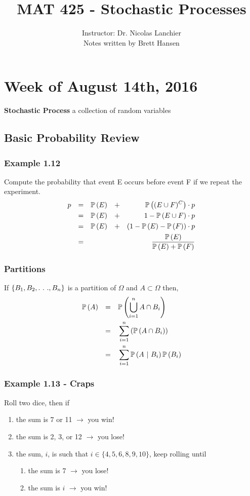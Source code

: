 \documentclass{article}
\title{MAT 425 - Stochastic Processes}
\author{
{\large Instructor: Dr. Nicolas Lanchier} \\
		Notes written by Brett Hansen
}
\date{}
\begin{document}
\maketitle
\tableofcontents
\break

\section{Week of August 14th, 2016}

\textbf{Stochastic Process} \quad a collection of random variables

\subsection{Basic Probability Review}
\subsubsection{Example 1.12}
Compute the probability that event E occurs before event F if we repeat the experiment.
\begin{align*}
p &&= &&\mathbb{P}\left(E\right) &&+ &&\mathbb{P}\left((E \cup F)^C\right) \cdot p \\
  &&= &&\mathbb{P}\left(E\right) &&+ &&1 - \mathbb{P}\left(E \cup F\right) \cdot p \\
  &&= &&\mathbb{P}\left(E\right) &&+ &&(1 - \mathbb{P}\left(E\right) - \mathbb{P}\left(F\right)) \cdot p \\
  &&= &&&&&&\frac{\mathbb{P}\left(E\right)}{\mathbb{P}\left(E\right) + \mathbb{P}\left(F\right)}
\end{align*}

\subsubsection{Partitions}
If $\{B_1, B_2, .\ .\ ., B_n\}$ is a partition of $\Omega$ and $A \subset \Omega$ then,
\begin{align*}
\mathbb{P}\left(A\right) 	&&= &&&\mathbb{P}\left(\bigcup_{i=1}^n A \cap B_i\right) \\
			&&= &&&\sum_{i=1}^n \left(\mathbb{P}\left(A \cap B_i\right)\right) \\
			&&= &&&\sum_{i=1}^n \mathbb{P}\left(A\ |\  B_i\right)\mathbb{P}\left(B_i\right)
\end{align*}

\subsubsection{Example 1.13 - Craps}
Roll two dice, then if
\begin{enumerate}
	\item the sum is 7 or 11 $\longrightarrow$ you win!
	\item the sum is 2, 3, or 12 $\longrightarrow$ you lose!
	\item the sum, $i$, is such that $i \in \{4, 5, 6, 8, 9, 10\}$, keep rolling until
	\begin{enumerate}
		\item the sum is 7 $\longrightarrow$ you lose!
		\item the sum is $i$ $\longrightarrow$ you win!
	\end{enumerate}
\end{enumerate}
\end{document}
